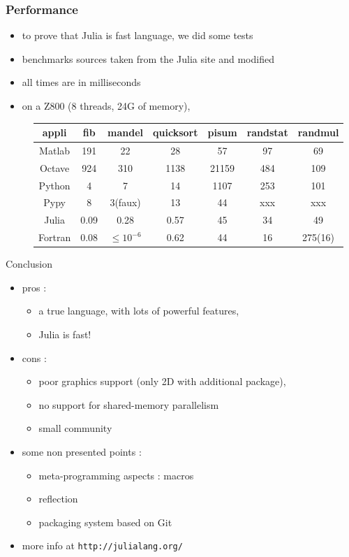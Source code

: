 \documentclass[11pt,mathserif]{beamer}
\newcommand{\julia}{{ Julia}{} }
\newcommand{\matlab}{{ Matlab}{} }
\begin{document}
\begin{frame}[fragile]
\frametitle{Performance}
\begin{itemize}[<+->]
  \item to prove that \julia is fast language, we did some tests
  \item benchmarks sources taken from the Julia site and modified
  \item all times are in milliseconds
  \item on a Z800 (8 threads, 24G of memory), 
\end{itemize}
\pause
\begin{figure}[H]
\begin{tabular}{|c|c|c|c|c|c|c|}
\hline
appli & fib & mandel & quicksort & pisum & randstat & randmul \\
\hline
\matlab & 191 & 22 & 28 & 57 & 97 & 69 \\
Octave & 924 & 310 & 1138 & 21159 & 484 & 109 \\
Python &  4  & 7  & 14 & 1107 & 253 & 101 \\
Pypy   & 8  &  3(faux) & 13 & 44 & xxx &xxx \\ 
Julia  & 0.09 & 0.28 & 0.57 & 45 & 34 & 49 \\
Fortran & 0.08 & $\leqslant 10^{-6}$ & 0.62 & 44 & 16 & 275(16) \\
\hline
\end{tabular}
\end{figure}
\end{frame}
\begin{frame}[fragile]{Conclusion}
\begin{itemize}[<+->] 
 \item pros : 
   \begin{itemize}
        \item  a true language, with lots of powerful features,  
        \item \julia is fast! 
   \end{itemize}
 \item cons : 
   \begin{itemize}
    \item poor graphics support (only 2D with additional package),
    \item no support for shared-memory parallelism 
    \item small community 
   \end{itemize}
 \item some non presented points : 
     \begin{itemize}
      \item meta-programming aspects : macros 
      \item reflection 
      \item packaging system based on Git
     \end{itemize} 
 \item more info at \texttt{http://julialang.org/}
\end{itemize} 
\end{frame}
\end{document}
